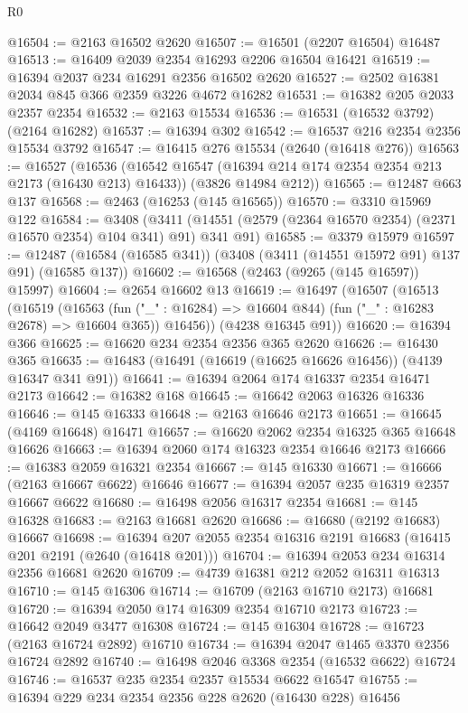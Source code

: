 \begin{lexlean}{R0}
\begin{coremodule}
@16504 := @2163 @16502 @2620
@16507 := @16501 (@2207 @16504) @16487
@16513 := @16409 @2039 @2354 @16293 @2206 @16504 @16421
@16519 := @16394 @2037 @234 @16291 @2356 @16502 @2620
@16527 := @2502 @16381 @2034 @845 @366 @2359 @3226 @4672 @16282
@16531 := @16382 @205 @2033 @2357 @2354
@16532 := @2163 @15534
@16536 := @16531 (@16532 @3792) (@2164 @16282)
@16537 := @16394 @302
@16542 := @16537 @216 @2354 @2356 @15534 @3792
@16547 := @16415 @276 @15534 (@2640 (@16418 @276))
@16563 := @16527
    (@16536
      (@16542 @16547 (@16394 @214 @174 @2354 @2354 @213 @2173 (@16430 @213) @16433))
      (@3826 @14984 @212))
@16565 := @12487 @663 @137
@16568 := @2463 (@16253 (@145 @16565))
@16570 := @3310 @15969 @122
@16584 := @3408
    (@3411 (@14551 (@2579 (@2364 @16570 @2354) (@2371 @16570 @2354) @104 @341) @91) @341 @91)
@16585 := @3379 @15979
@16597 := @12487 (@16584 (@16585 @341)) (@3408 (@3411 (@14551 @15972 @91) @137 @91) (@16585 @137))
@16602 := @16568 (@2463 (@9265 (@145 @16597)) @15997)
@16604 := @2654 @16602 @13
@16619 := @16497
    (@16507
      (@16513
        (@16519
          (@16563 (fun ("_" : @16284) => @16604 @844) (fun ("_" : @16283 @2678) => @16604 @365))
          @16456))
      (@4238 @16345 @91))
@16620 := @16394 @366
@16625 := @16620 @234 @2354 @2356 @365 @2620
@16626 := @16430 @365
@16635 := @16483 (@16491 (@16619 (@16625 @16626 @16456)) (@4139 @16347 @341 @91))
@16641 := @16394 @2064 @174 @16337 @2354 @16471 @2173
@16642 := @16382 @168
@16645 := @16642 @2063 @16326 @16336
@16646 := @145 @16333
@16648 := @2163 @16646 @2173
@16651 := @16645 (@4169 @16648) @16471
@16657 := @16620 @2062 @2354 @16325 @365 @16648 @16626
@16663 := @16394 @2060 @174 @16323 @2354 @16646 @2173
@16666 := @16383 @2059 @16321 @2354
@16667 := @145 @16330
@16671 := @16666 (@2163 @16667 @6622) @16646
@16677 := @16394 @2057 @235 @16319 @2357 @16667 @6622
@16680 := @16498 @2056 @16317 @2354
@16681 := @145 @16328
@16683 := @2163 @16681 @2620
@16686 := @16680 (@2192 @16683) @16667
@16698 := @16394 @207 @2055 @2354 @16316 @2191 @16683 (@16415 @201 @2191 (@2640 (@16418 @201)))
@16704 := @16394 @2053 @234 @16314 @2356 @16681 @2620
@16709 := @4739 @16381 @212 @2052 @16311 @16313
@16710 := @145 @16306
@16714 := @16709 (@2163 @16710 @2173) @16681
@16720 := @16394 @2050 @174 @16309 @2354 @16710 @2173
@16723 := @16642 @2049 @3477 @16308
@16724 := @145 @16304
@16728 := @16723 (@2163 @16724 @2892) @16710
@16734 := @16394 @2047 @1465 @3370 @2356 @16724 @2892
@16740 := @16498 @2046 @3368 @2354 (@16532 @6622) @16724
@16746 := @16537 @235 @2354 @2357 @15534 @6622 @16547
@16755 := @16394 @229 @234 @2354 @2356 @228 @2620 (@16430 @228) @16456

\end{coremodule}
\end{lexlean}
